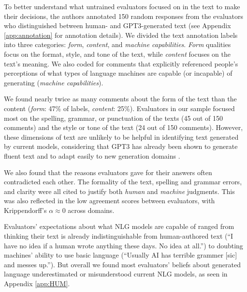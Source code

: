To better understand what untrained evaluators focused on in the text to make their decisions, the authors annotated 150 random responses from the evaluators who distinguished between human- and GPT3-generated text (see Appendix \ref{app:annotation} for annotation details).
We divided the text annotation labels into three categories: \textit{form}, \textit{content}, and \textit{machine capabilities}. \textit{Form} qualities focus on the format, style, and tone of the text, while \textit{content} focuses on the text's meaning. We also coded for comments that explicitly referenced people's perceptions of what types of language machines are capable (or incapable) of generating (\textit{machine capabilities}).

We found nearly twice as many comments about the form of the text than the content (\textit{form}: 47\% of labels, \textit{content}: 25\%). Evaluators in our sample focused most on the spelling, grammar, or punctuation of the texts (45 out of 150 comments) and the style or tone of the text (24 out of 150 comments). However, these dimensions of text are unlikely to be helpful in identifying text generated by current models, considering that GPT3 has already been shown to generate fluent text and to adapt easily to new generation domains \citep{gpt3}.

We also found that the reasons evaluators gave for their answers often contradicted each other. The formality of the text, spelling and grammar errors, and clarity were all cited to justify both \textit{human} and \textit{machine} judgments.
This was also reflected in the low agreement scores between evaluators, with Krippendorff's $\alpha\approx0$ across domains.

Evaluators' expectations about what NLG models are capable of ranged from thinking their text is already indistinguishable from human-authored text (``I have no idea if a human wrote anything these days. No idea at all.'') to doubting machines' ability to use basic language (``Usually AI has terrible grammer [sic] and messes up.'').
But overall we found most evaluators' beliefs about generated language underestimated or misunderstood current NLG models, as seen in Appendix \ref{app:HUM}.